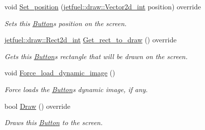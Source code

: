 \begin{DoxyCompactItemize}
void \hyperlink{classjetfuel_1_1gui_1_1Button_a642d3f1412339c826458b80dce76ef34}{Set\+\_\+position} (\hyperlink{classjetfuel_1_1draw_1_1Vector2d}{jetfuel\+::draw\+::\+Vector2d\+\_\+int} position) override
\begin{DoxyCompactList}\small\item\em Sets this \hyperlink{classjetfuel_1_1gui_1_1Button}{Button}\textquotesingle{}s position on the screen. \end{DoxyCompactList}\item 
\hyperlink{classjetfuel_1_1draw_1_1Rect2d}{jetfuel\+::draw\+::\+Rect2d\+\_\+int} \hyperlink{classjetfuel_1_1gui_1_1Button_a99615af8c169d2274b1593a29fdaf7ca}{Get\+\_\+rect\+\_\+to\+\_\+draw} () override
\begin{DoxyCompactList}\small\item\em Gets this \hyperlink{classjetfuel_1_1gui_1_1Button}{Button}\textquotesingle{}s rectangle that will be drawn on the screen. \end{DoxyCompactList}\item 
void \hyperlink{classjetfuel_1_1gui_1_1Button_a4269075522becce58d220d3aa4bbd6ec}{Force\+\_\+load\+\_\+dynamic\+\_\+image} ()
\begin{DoxyCompactList}\small\item\em Force loads the \hyperlink{classjetfuel_1_1gui_1_1Button}{Button}\textquotesingle{}s dynamic image, if any. \end{DoxyCompactList}\item 
bool \hyperlink{classjetfuel_1_1gui_1_1Button_a1c8ec68b90dc461b1603c47fb8c509c4}{Draw} () override
\begin{DoxyCompactList}\small\item\em Draws this \hyperlink{classjetfuel_1_1gui_1_1Button}{Button} to the screen. \end{DoxyCompactList}\end{DoxyCompactItemize}
